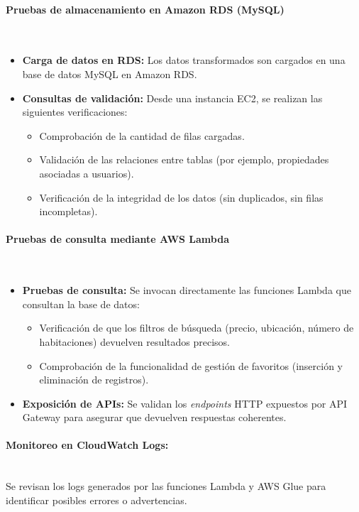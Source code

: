 \documentclass{article}
\begin{document}
\paragraph{Pruebas de almacenamiento en Amazon RDS (MySQL)} \mbox{} \\
\begin{itemize}
    \item \textbf{Carga de datos en RDS:} Los datos transformados son cargados en una base de datos MySQL en Amazon RDS.
    \item \textbf{Consultas de validación:} Desde una instancia EC2, se realizan las siguientes verificaciones:
    \begin{itemize}
        \item Comprobación de la cantidad de filas cargadas.
        \item Validación de las relaciones entre tablas (por ejemplo, propiedades asociadas a usuarios).
        \item Verificación de la integridad de los datos (sin duplicados, sin filas incompletas).
    \end{itemize}
\end{itemize}

\paragraph{Pruebas de consulta mediante AWS Lambda} \mbox{} \\
\begin{itemize}
    \item \textbf{Pruebas de consulta:} Se invocan directamente las funciones Lambda que consultan la base de datos:
    \begin{itemize}
        \item Verificación de que los filtros de búsqueda (precio, ubicación, número de habitaciones) devuelven resultados precisos.
        \item Comprobación de la funcionalidad de gestión de favoritos (inserción y eliminación de registros).
    \end{itemize}
    \item \textbf{Exposición de APIs:} Se validan los \textit{endpoints} HTTP expuestos por API Gateway para asegurar que devuelven respuestas coherentes.
\end{itemize}

\paragraph{Monitoreo en CloudWatch Logs:} \mbox{} \\
Se revisan los logs generados por las funciones Lambda y AWS Glue para identificar posibles errores o advertencias.
\end{document}

